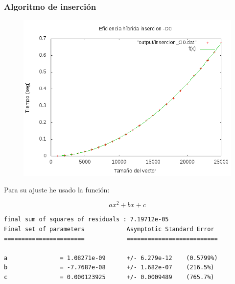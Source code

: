 \documentclass[spanish]{beamer}
\begin{document}
%
%

\begin{frame}\frametitle{Algoritmo de inserción}
  \begin{figure}[H]
    \centering   
        \includegraphics[clip,width=1\columnwidth]{../../plots/insercion_O0_fit.png}%
    \end{figure}
\end{frame}

\begin{frame}[fragile]
  Para su ajuste he usado la función:

  $$ax^2+bx+c$$
  
\scriptsize
\begin{verbatim}
final sum of squares of residuals : 7.19712e-05
Final set of parameters            Asymptotic Standard Error
=======================            ==========================

a               = 1.08271e-09      +/- 6.279e-12    (0.5799%)
b               = -7.7687e-08      +/- 1.682e-07    (216.5%)
c               = 0.000123925      +/- 0.0009489    (765.7%)
\end{verbatim}

\end{frame}


%
%
\end{document}
